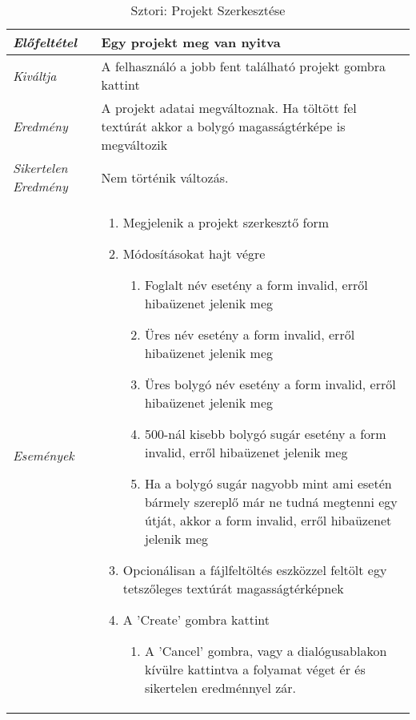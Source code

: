 \begin{table}[H]
	\centering
	\begin{tabular}{ | m{} | m{} | }
		\hline
		\emph{Előfeltétel} & Egy projekt meg van nyitva  \\
		\hline
		\emph{Kiváltja} & A felhasználó a jobb fent található projekt gombra kattint \\
		\hline
		\emph{Eredmény} & A projekt adatai megváltoznak. Ha töltött fel textúrát akkor a bolygó magasságtérképe is megváltozik    \\
		\hline
		\emph{Sikertelen Eredmény} & Nem történik változás.  \\
		\hline
		\hline
		\emph{Események} &

		\begin{enumerate}
			\item Megjelenik a projekt szerkesztő form
			\item Módosításokat hajt végre
			\begin{enumerate}
				\item Foglalt név esetény a form invalid, erről hibaüzenet jelenik meg
				\item Üres név esetény a form invalid, erről hibaüzenet jelenik meg
				\item Üres bolygó név esetény a form invalid, erről hibaüzenet jelenik meg
				\item 500-nál kisebb bolygó sugár esetény a form invalid, erről hibaüzenet jelenik meg
				\item Ha a bolygó sugár nagyobb mint ami esetén bármely szereplő már ne tudná megtenni egy útját, akkor a form invalid, erről hibaüzenet jelenik meg
			\end{enumerate}
			\item Opcionálisan a fájlfeltöltés eszközzel feltölt egy tetszőleges textúrát magasságtérképnek
			\item A 'Create' gombra kattint
			\begin{enumerate}
				\item A 'Cancel' gombra, vagy a dialógusablakon kívülre kattintva a folyamat véget ér és sikertelen eredménnyel zár.
			\end{enumerate}
		\end{enumerate}

		\\
		\hline
	\end{tabular}
	\caption{Sztori: Projekt Szerkesztése}
	\label{tab:story-project-edit}
\end{table}


